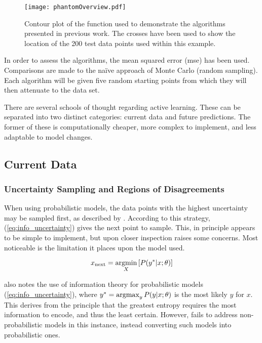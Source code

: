 \begin{figure}[h]
    \begin{center}
        \texttt{[image: phantomOverview.pdf]}
        \caption[Toy Dataset]{Contour plot of the function used to demonstrate the algorithms presented in previous work. The crosses have been used to show the location of the 200 test data points used within this example.}
        \label{fig:phantom}
    \end{center}
\end{figure}

In order to assess the algorithms, the mean squared error (mse) has been used. Comparisons are made to the na\"ive approach of Monte Carlo (random sampling). Each algorithm will be given five random starting points from which they will then attenuate to the data set.

There are several schools of thought regarding active learning. These can be separated into two distinct categories: current data and future predictions. The former of these is computationally cheaper, more complex to implement, and less adaptable to model changes.

\subsection{Current Data}
\subsubsection{Uncertainty Sampling and Regions of Disagreements}
\label{sec:UncertaintySampling}

When using probabilistic models, the data points with the highest uncertainty may be sampled first, as described by \textcite{Set09}. According to this strategy, (\ref{eq:info_uncertainty}) gives the next point to sample. This, in principle appears to be simple to implement, but upon closer inspection raises some concerns. Most noticeable is the limitation it places upon the model used.

\begin{equation}
    \label{eq:info_uncertainty}
    {x_\mathrm{next}=\operatorname*{argmin}_X{\left[P(y^{*}|x;\theta{})\right]}}
\end{equation}

\textcite{Set09} also notes the use of information theory for probabilistic models (\ref{eq:info_uncertainty}), where \mbox{${y^{*}=\operatorname*{argmax}_y{}P(y|x;\theta{})}$} is the most likely $y$ for $x$. This derives from the principle that the greatest entropy requires the most information to encode, and thus the least certain. However, \textcite{Set09} fails to address non-probabilistic models in this instance, instead converting such models into probabilistic ones.

